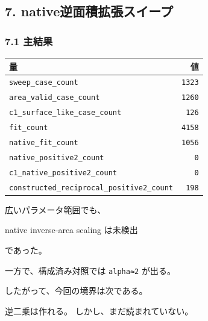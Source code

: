 \documentclass[
]{article}
\newenvironment{Shaded}{}{}
\newcommand{\NormalTok}[1]{#1}
\newcounter{none} %
\begin{document}
\subsection{7.
native逆面積拡張スイープ}\label{nativeux9006ux9762ux7a4dux62e1ux5f35ux30b9ux30a4ux30fcux30d7}

\subsubsection{7.1 主結果}\label{ux4e3bux7d50ux679c-5}

{\def\LTcaptype{none} %
\begin{longtable}[]{@{}lr@{}}
\toprule\noalign{}
量 & 値 \\
\midrule\noalign{}
\endhead
\bottomrule\noalign{}
\endlastfoot
\texttt{sweep\_case\_count} & \texttt{1323} \\
\texttt{area\_valid\_case\_count} & \texttt{1260} \\
\texttt{c1\_surface\_like\_case\_count} & \texttt{126} \\
\texttt{fit\_count} & \texttt{4158} \\
\texttt{native\_fit\_count} & \texttt{1056} \\
\texttt{native\_positive2\_count} & \texttt{0} \\
\texttt{c1\_native\_positive2\_count} & \texttt{0} \\
\texttt{constructed\_reciprocal\_positive2\_count} & \texttt{198} \\
\end{longtable}
}

広いパラメータ範囲でも、

\begin{Shaded}
\begin{Highlighting}[]
\NormalTok{native inverse{-}area scaling は未検出}
\end{Highlighting}
\end{Shaded}

であった。

一方で、構成済み対照では \texttt{alpha≈2} が出る。

したがって、今回の境界は次である。

\begin{Shaded}
\begin{Highlighting}[]
\NormalTok{逆二乗は作れる。}
\NormalTok{しかし、まだ読まれていない。}
\end{Highlighting}
\end{Shaded}
\end{document}

